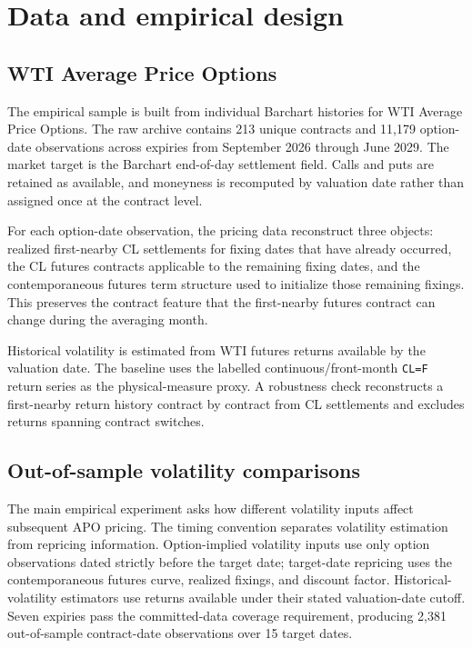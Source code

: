 \section{Data and empirical design}\label{sec:short_design}

\subsection{WTI Average Price Options}

The empirical sample is built from individual Barchart histories for WTI Average Price Options. The raw archive contains 213 unique contracts and 11,179 option-date observations across expiries from September 2026 through June 2029. The market target is the Barchart end-of-day settlement field. Calls and puts are retained as available, and moneyness is recomputed by valuation date rather than assigned once at the contract level.

For each option-date observation, the pricing data reconstruct three objects: realized first-nearby CL settlements for fixing dates that have already occurred, the CL futures contracts applicable to the remaining fixing dates, and the contemporaneous futures term structure used to initialize those remaining fixings. This preserves the contract feature that the first-nearby futures contract can change during the averaging month.

Historical volatility is estimated from WTI futures returns available by the valuation date. The baseline uses the labelled continuous/front-month \texttt{CL=F} return series as the physical-measure proxy. A robustness check reconstructs a first-nearby return history contract by contract from CL settlements and excludes returns spanning contract switches.

\subsection{Out-of-sample volatility comparisons}

The main empirical experiment asks how different volatility inputs affect subsequent APO pricing. The timing convention separates volatility estimation from repricing information. Option-implied volatility inputs use only option observations dated strictly before the target date; target-date repricing uses the contemporaneous futures curve, realized fixings, and discount factor. Historical-volatility estimators use returns available under their stated valuation-date cutoff. Seven expiries pass the committed-data coverage requirement, producing 2,381 out-of-sample contract-date observations over 15 target dates.

